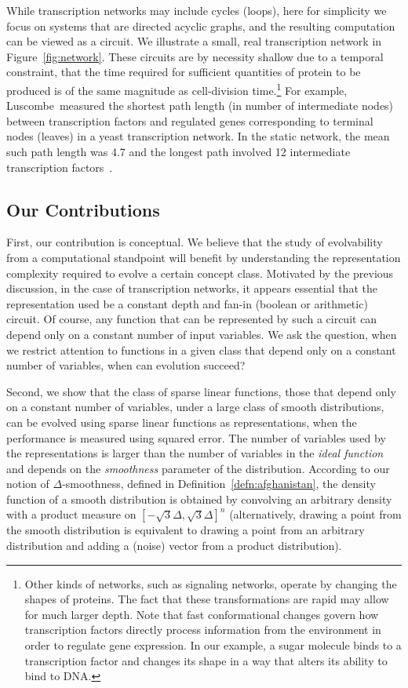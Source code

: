 While transcription networks may include cycles (loops), here for simplicity we
focus on systems that are directed acyclic graphs, and the resulting computation
can be viewed as a circuit. We illustrate a small, real transcription network in
Figure~\ref{fig:network}. These circuits are by necessity shallow due to
a temporal constraint, that the time required for sufficient quantities of
protein to be produced is of the same magnitude as cell-division
time.\footnote{Other kinds of networks, such as signaling networks, operate by
changing the shapes of proteins. The fact that these transformations are rapid
may allow for much larger depth. Note that fast conformational changes govern
how transcription factors directly process information from the environment in
order to regulate gene expression.  In our example, a sugar molecule binds to a
transcription factor and changes its shape in a way that alters its ability to
bind to DNA.} For example, Luscombe~\etal measured the shortest path length (in
number of intermediate nodes) between transcription factors and regulated genes
corresponding to terminal nodes (leaves) in a yeast transcription network. In
the static network, the mean such path length was 4.7 and the longest path
involved 12 intermediate transcription factors~\cite{Luscombe:2004}.

\subsection{Our Contributions}

First, our contribution is conceptual. We believe that the study of evolvability
from a computational standpoint will benefit by understanding the representation
complexity required to evolve a certain concept class. Motivated by the previous
discussion, in the case of transcription networks, it appears essential that the
representation used be a constant depth and fan-in (boolean or arithmetic)
circuit. Of course, any function that can be represented by such a circuit can
depend only on a constant number of input variables. We ask the
question, when we restrict attention to functions in a given class that depend
only on a constant number of variables, when can evolution succeed?

Second, we show that the class of sparse linear functions, those that depend
only on a constant number of variables, under a large class of smooth
distributions, can be evolved using sparse linear functions as representations,
when the performance is measured using squared error. The number of variables
used by the representations is larger than the number of variables in the
\emph{ideal function} and depends on the \emph{smoothness} parameter of the
distribution. According to our notion of $\Delta$-smoothness, defined in
Definition~\ref{defn:afghanistan}, the density function of a smooth distribution
is obtained by convolving an arbitrary density with a product measure on
$[-\sqrt{3}\Delta, \sqrt{3}\Delta]^n$ (alternatively, drawing a point from the
smooth distribution is equivalent to drawing a point from an arbitrary
distribution and adding a (noise) vector from a product distribution). 

